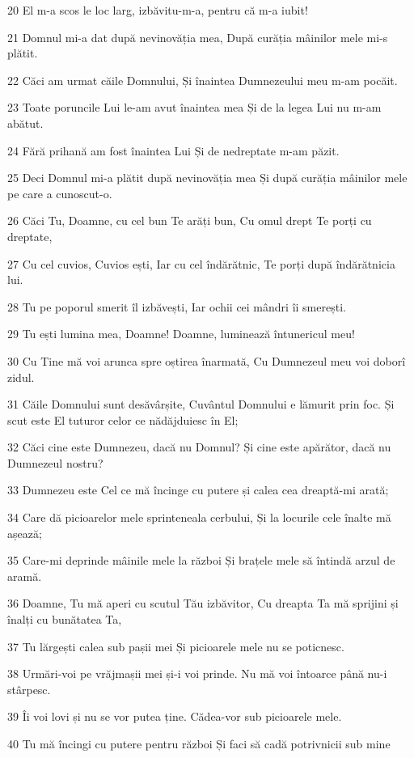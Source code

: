 \par 20 El m-a scos le loc larg, izbăvitu-m-a, pentru că m-a iubit!
\par 21 Domnul mi-a dat după nevinovăția mea, După curăția mâinilor mele mi-s plătit.
\par 22 Căci am urmat căile Domnului, Și înaintea Dumnezeului meu m-am pocăit.
\par 23 Toate poruncile Lui le-am avut înaintea mea Și de la legea Lui nu m-am abătut.
\par 24 Fără prihană am fost înaintea Lui Și de nedreptate m-am păzit.
\par 25 Deci Domnul mi-a plătit după nevinovăția mea Și după curăția mâinilor mele pe care a cunoscut-o.
\par 26 Căci Tu, Doamne, cu cel bun Te arăți bun, Cu omul drept Te porți cu dreptate,
\par 27 Cu cel cuvios, Cuvios ești, Iar cu cel îndărătnic, Te porți după îndărătnicia lui.
\par 28 Tu pe poporul smerit îl izbăvești, Iar ochii cei mândri îi smerești.
\par 29 Tu ești lumina mea, Doamne! Doamne, luminează întunericul meu!
\par 30 Cu Tine mă voi arunca spre oștirea înarmată, Cu Dumnezeul meu voi doborî zidul.
\par 31 Căile Domnului sunt desăvârșite, Cuvântul Domnului e lămurit prin foc. Și scut este El tuturor celor ce nădăjduiesc în El;
\par 32 Căci cine este Dumnezeu, dacă nu Domnul? Și cine este apărător, dacă nu Dumnezeul nostru?
\par 33 Dumnezeu este Cel ce mă încinge cu putere și calea cea dreaptă-mi arată;
\par 34 Care dă picioarelor mele sprinteneala cerbului, Și la locurile cele înalte mă așează;
\par 35 Care-mi deprinde mâinile mele la război Și brațele mele să întindă arzul de aramă.
\par 36 Doamne, Tu mă aperi cu scutul Tău izbăvitor, Cu dreapta Ta mă sprijini și înalți cu bunătatea Ta,
\par 37 Tu lărgești calea sub pașii mei Și picioarele mele nu se poticnesc.
\par 38 Urmări-voi pe vrăjmașii mei și-i voi prinde. Nu mă voi întoarce până nu-i stârpesc.
\par 39 Îi voi lovi și nu se vor putea ține. Cădea-vor sub picioarele mele.
\par 40 Tu mă încingi cu putere pentru război Și faci să cadă potrivnicii sub mine
